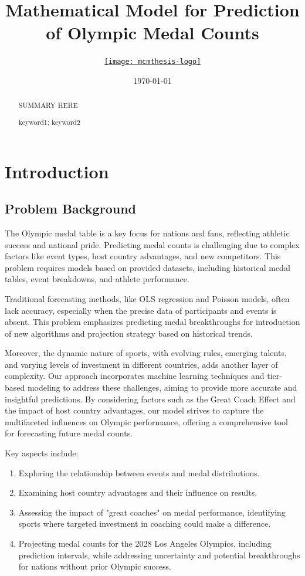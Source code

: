 \documentclass{mcmthesis}
\title{Mathematical Model for Prediction of Olympic Medal Counts}
\author{\small \href{https://www.latexstudio.net/}
  {\texttt{[image: mcmthesis-logo]}}}
\date{\today}
\begin{document}
\begin{abstract}
    \par 
        SUMMARY HERE

\begin{keywords}
    keyword1; keyword2
\end{keywords}

\end{abstract}
\maketitle
\tableofcontents
\newpage

\section{Introduction}
\subsection{Problem Background}
The Olympic medal table is a key focus for nations and fans, reflecting athletic success and national pride. Predicting medal counts is challenging due to complex factors like event types, host country advantages, and new competitors. This problem requires models based on provided datasets, including historical medal tables, event breakdowns, and athlete performance.

Traditional forecasting methods, like OLS regression and Poisson models, often lack accuracy, especially when the precise data of participants and events is absent. This problem emphasizes predicting medal breakthroughs for introduction of new algorithms and projection strategy based on historical trends.

Moreover, the dynamic nature of sports, with evolving rules, emerging talents, and varying levels of investment in different countries, adds another layer of complexity. Our approach incorporates machine learning techniques and tier-based modeling to address these challenges, aiming to provide more accurate and insightful predictions. By considering factors such as the Great Coach Effect and the impact of host country advantages, our model strives to capture the multifaceted influences on Olympic performance, offering a comprehensive tool for forecasting future medal counts.

Key aspects include:
\begin{enumerate}
    \item Exploring the relationship between events and medal distributions.
    \item Examining host country advantages and their influence on results.
    \item Assessing the impact of "great coaches" on medal performance, identifying sports where targeted investment in coaching could make a difference.
    \item Projecting medal counts for the 2028 Los Angeles Olympics, including prediction intervals, while addressing uncertainty and potential breakthroughs for nations without prior Olympic success.
\end{enumerate}
\end{document}
